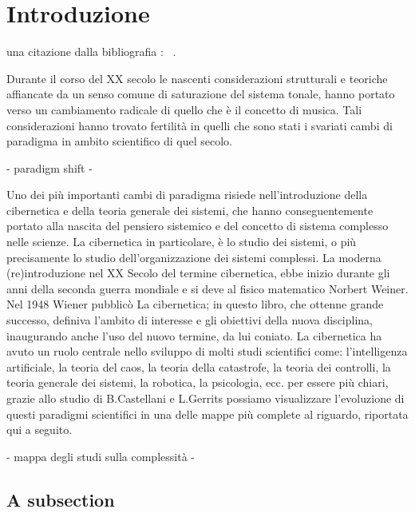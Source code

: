 \section{Introduzione}
\label{sec:introduzione}

una citazione dalla bibliografia : ~\cite{Hasselmo5249}. 

Durante il corso del XX secolo le nascenti considerazioni strutturali e teoriche
affiancate da un senso comune di saturazione del sistema tonale,
hanno portato verso un cambiamento radicale di quello che è il concetto di musica.
Tali considerazioni hanno trovato fertilità in quelli
che sono stati i svariati cambi di paradigma in ambito scientifico di quel secolo.

- paradigm shift -

Uno dei più importanti cambi di paradigma risiede nell'introduzione della
cibernetica e della teoria generale dei sistemi, che hanno conseguentemente
portato alla nascita del pensiero sistemico e del concetto di sistema complesso nelle scienze.
La cibernetica in particolare, è lo studio dei sistemi, o più precisamente lo studio
dell'organizzazione dei sistemi complessi.
La moderna (re)introduzione nel XX Secolo del termine cibernetica,
ebbe inizio durante gli anni della seconda guerra mondiale e si
deve al fisico matematico Norbert Weiner.
Nel 1948 Wiener pubblicò La cibernetica; in questo libro, che ottenne grande successo,
definiva l'ambito di interesse e gli obiettivi della nuova disciplina,
inaugurando anche l'uso del nuovo termine, da lui coniato.
La cibernetica ha avuto un ruolo centrale nello sviluppo di molti studi scientifici
come:
l'intelligenza artificiale, la teoria del caos, la teoria della catastrofe,
la teoria dei controlli, la teoria generale dei sistemi, la robotica, la psicologia,
ecc.
per essere più chiari,
grazie allo studio di B.Castellani e L.Gerrits possiamo visualizzare l'evoluzione
di questi paradigmi scientifici in una delle mappe più complete al riguardo, riportata
qui a seguito.


- mappa degli studi sulla complessità -

\subsection{A subsection}
\label{sec:asubsection}

\lipsum[1-2]

